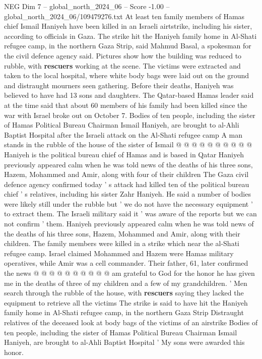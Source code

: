 \begin{textsample}{NEG Dim 7 – global\_north\_2024\_06 – Score -1.00 – global\_north\_2024\_06/109479276.txt}  \label{ex:f7_neg_369}
At least ten family members of Hamas chief Ismail Haniyeh have been killed in an Israeli airtstrike, including his sister, according to officials in Gaza.
The strike hit the Haniyeh family home in Al-Shati refugee camp, in the northern Gaza Strip, said Mahmud Basal, a spokesman for the civil defence agency said.
Pictures show how the building was reduced to rubble, with \textbf{rescuers} working at the scene.
The victims were extracted and taken to the local hospital, where white body bags were laid out on the ground and distraught mourners seen gathering.
Before their deaths, Haniyeh was believed to have had 13 sons and daughters.
The Qatar-based Hamas leader said at the time said that about 60 members of his family had been killed since the war with Israel broke out on October 7.
Bodies of ten people, including the sister of Hamas Political Bureau Chairman Ismail Haniyeh, are brought to al-Ahli Baptist Hospital after the Israeli attack on the Al-Shati refugee camp A man stands in the rubble of the house of the sister of Ismail @ @ @ @ @ @ @ @ @ @ Haniyeh is the political bureau chief of Hamas and is based in Qatar Haniyeh previously appeared calm when he was told news of the deaths of his three sons, Hazem, Mohammed and Amir, along with four of their children The Gaza civil defence agency confirmed today ' s attack had killed ten of the political bureau chief ' s relatives, including his sister Zahr Haniyeh.
He said a number of bodies were likely still under the rubble but ' we do not have the necessary equipment ' to extract them.
The Israeli military said it ' was aware of the reports but we can not confirm ' them.
Haniyeh previously appeared calm when he was told news of the deaths of his three sons, Hazem, Mohammed and Amir, along with their children.
The family members were killed in a strike which near the al-Shati refugee camp.
Israel claimed Mohammed and Hazem were Hamas military operatives, while Amir was a cell commander.
Their father, 61, later confirmed the news @ @ @ @ @ @ @ @ @ @ am grateful to God for the honor he has given me in the deaths of three of my children and a few of my grandchildren. ' Men search through the rubble of the house, with \textbf{rescuers} saying they lacked the equipment to retrieve all the victims The strike is said to have hit the Haniyeh family home in Al-Shati refugee camp, in the northern Gaza Strip Distraught relatives of the deceased look at body bags of the victims of an airstrike Bodies of ten people, including the sister of Hamas Political Bureau Chairman Ismail Haniyeh, are brought to al-Ahli Baptist Hospital ' My sons were awarded this honor.

\end{textsample}
